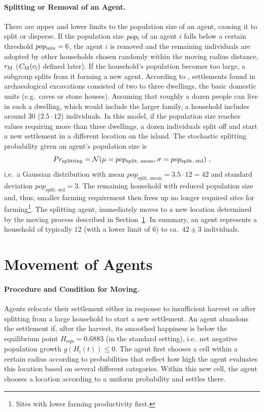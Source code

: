 \paragraph{Splitting or Removal of an Agent.}
There are upper and lower limits to the population size of an agent, causing it to split or disperse.
If the population size $pop_{\rm i}$ of an agent $i$ falls below a certain threshold $pop_{\rm min} = 6$, the agent $i$ is removed and the remaining individuals are adopted by other households chosen randomly within the moving radius distance, $r_{\rm M}$ ($C_{\rm M}(c_{\rm i})$ defined later).
If the household's population becomes too large, a subgroup splits from it forming a new agent.
According to \citet{Bahn2017}, settlements found in archaeological excavations consisted of two to three dwellings, the basic domestic units (e.g.\ caves or stone houses). 
Assuming that roughly a dozen people can live in such a dwelling, which would include the larger family, a household includes around $30$ ($2.5\cdot 12$) individuals.
In this model, if the population size reaches values requiring more than three dwellings, a dozen individuals split off and start a new settlement in a different location on the island. 
The stochastic splitting probability given an agent's population size is
\begin{equation}
Pr_{\rm splitting} = \mathcal{N}( \mu = pop_\text{split, mean}, \sigma = pop_\text{split, std})\ ,
\end{equation}
i.e.\ a Gaussian distribution with mean $pop_\text{split, mean} = 3.5 \cdot 12 = 42$ and standard deviation $pop_\text{split, std} = 3$.
The remaining household with reduced population size and, thus, smaller farming requirement then frees up no longer required sites for farming\footnote{Sites with lower farming productivity first.}.
The splitting agent, immediately moves to a new location determined by the moving process described in Section~\ref{sec:Moving}.
In summary, an agent represents a household of typically $12$ (with a lower limit of $6$) to ca.\ $42\pm 3$ individuals. %

\FloatBarrier
\section{Movement of Agents}\label{sec:Moving}
\paragraph{Procedure and Condition for Moving.}
Agents relocate their settlement either in response to insufficient harvest or after splitting from a large household to start a new settlement.
An agent abandons the settlement if, after the harvest, its smoothed happiness is below the equilibrium point $H_\text{equ}=0.6883$ (in the standard setting), i.e.\ net negative population growth $g(H_\text{i}(t))\leq 0$.
The agent first chooses a cell within a certain radius according to probabilities that reflect how high the agent evaluates this location based on several different categories.
Within this new cell, the agent chooses a location according to a uniform probability and settles there.

